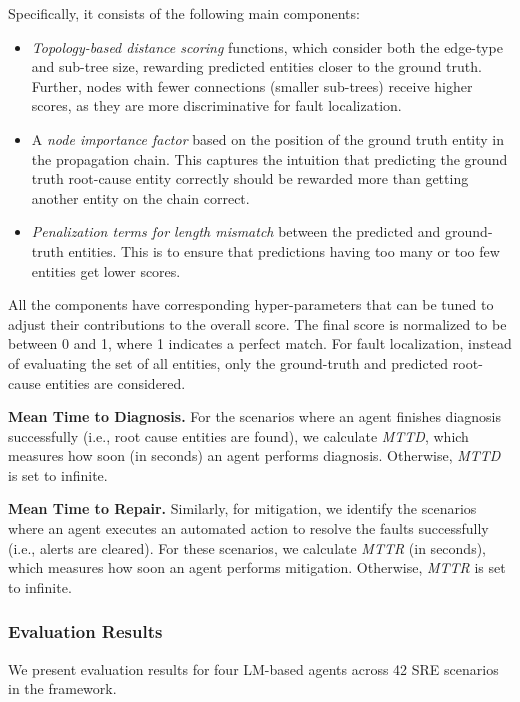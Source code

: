 Specifically, it consists of the following main components:
\begin{itemize}
    \item \textit{Topology-based distance scoring} functions, which consider both the edge-type and sub-tree size, rewarding predicted entities closer to the ground truth. %
    Further, nodes with fewer connections (smaller sub-trees) receive higher scores, as they are more discriminative for fault localization.%
    
    \item A \textit{node importance factor} based on the position of the ground truth entity in the propagation chain. This captures the intuition that predicting the ground truth root-cause entity correctly should be rewarded more than getting another entity on the chain correct.
    \item \textit{Penalization terms for length mismatch} between the predicted and ground-truth entities. This is to ensure that predictions having too many or too few entities get lower scores.
\end{itemize}

All the components have corresponding hyper-parameters that can be tuned to adjust their contributions to the overall score. The final score is normalized to be between 0 and 1, where 1 indicates a perfect match. For fault localization, instead of evaluating the set of all entities, only the ground-truth and predicted root-cause entities are considered.




\textbf{Mean Time to Diagnosis.}
For the scenarios where an agent finishes diagnosis successfully (i.e., root cause entities are found), we calculate \textit{MTTD}, which measures how soon (in seconds) an agent performs diagnosis. Otherwise, \textit{MTTD} is set to infinite. 

\textbf{Mean Time to Repair.}
Similarly, for mitigation, we identify the scenarios where an agent executes an automated action to resolve the faults successfully (i.e., alerts are cleared). For these scenarios, we calculate \textit{MTTR} (in seconds), which measures how soon an agent performs mitigation. Otherwise, \textit{MTTR} is set to infinite. 

\subsubsection{Evaluation Results}

We present evaluation results for four LM-based agents across 42 SRE scenarios in the \bench framework.



